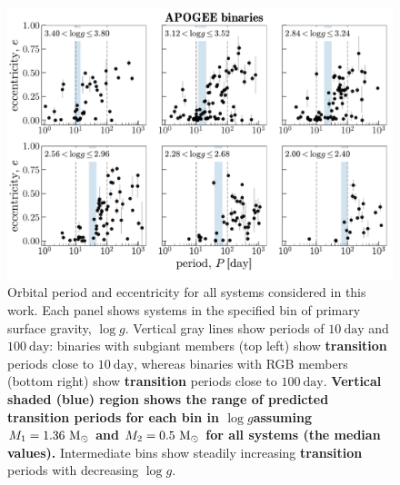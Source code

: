 \documentclass[modern, letterpaper]{aastex62}
\newcommand{\logg}{\ensuremath{\log g}}
\renewcommand{\changes}[1]{\textbf{#1}}
\begin{document}
\begin{figure}[t]
\begin{center}
\includegraphics[width=\textwidth]{P-e-grid}
\end{center}
\caption{%
Orbital period and eccentricity for all systems considered in this work.
Each panel shows systems in the specified bin of primary surface gravity, \logg.
Vertical gray lines show periods of $10~\textrm{day}$ and $100~\textrm{day}$:
binaries with subgiant members (top left) show \changes{transition} periods
close to $10~\textrm{day}$, whereas binaries with RGB members (bottom right)
show \changes{transition} periods close to $100~\textrm{day}$.
\changes{Vertical shaded (blue) region shows the range of predicted transition periods for each bin in \logg assuming $M_1 = 1.36~\mathrm{M}_\odot$ and $M_2 = 0.5~\mathrm{M}_\odot$ for all systems (the median values).}
Intermediate bins show steadily increasing \changes{transition} periods with
decreasing \logg.
\label{fig:P-e-grid}
}
\end{figure}
\end{document}

